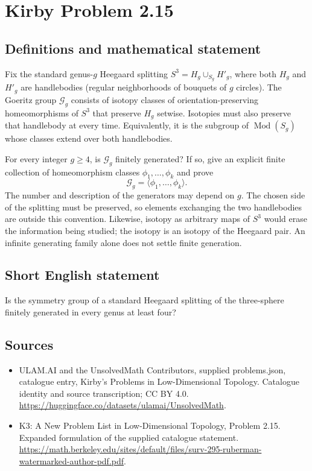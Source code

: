 \documentclass[11pt,a4paper]{article}
\begin{document}
\section*{Kirby Problem 2.15}\label{statement}

\subsection{Definitions and mathematical statement}
Fix the standard genus-$g$ Heegaard splitting
$S^3=H_g\cup_{S_g}H'_g$, where both $H_g$ and $H'_g$ are handlebodies
(regular neighborhoods of bouquets of $g$ circles). The Goeritz group
$\mathcal G_g$ consists of isotopy classes of orientation-preserving
homeomorphisms of $S^3$ that preserve $H_g$ setwise. Isotopies must also preserve
that handlebody at every time. Equivalently, it is the subgroup of
$\operatorname{Mod}(S_g)$ whose classes extend over both handlebodies.

For every integer $g\geq4$, is $\mathcal G_g$ finitely generated? If so, give
an explicit finite collection of homeomorphism classes
$\phi_1,\ldots,\phi_k$ and prove
\[
\mathcal G_g=\langle\phi_1,\ldots,\phi_k\rangle.
\]
The number and description of the generators may depend on $g$.
The chosen side of the splitting must be preserved, so elements exchanging
the two handlebodies are outside this convention. Likewise, isotopy as arbitrary
maps of $S^3$ would erase the information being studied; the isotopy is an
isotopy of the Heegaard pair. An infinite generating family alone does not
settle finite generation.
\subsection{Short English statement}
Is the symmetry group of a standard Heegaard splitting of the three-sphere finitely generated in every genus at least four?
\subsection{Sources}
\begin{itemize}
\item[S1] ULAM.AI and the UnsolvedMath Contributors, supplied problems.json, catalogue entry, Kirby's Problems in Low-Dimensional Topology. Catalogue identity and source transcription; CC BY 4.0.
\url{https://huggingface.co/datasets/ulamai/UnsolvedMath}.
\item[S2] K3: A New Problem List in Low-Dimensional Topology, Problem 2.15. Expanded formulation of the supplied catalogue statement.
\url{https://math.berkeley.edu/sites/default/files/surv-295-ruberman-watermarked-author-pdf.pdf}.
\end{itemize}
\end{document}
